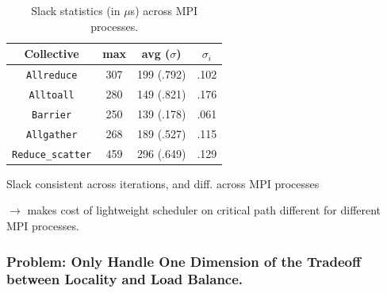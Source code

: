 {\begin{frame}
\begin{table}[tr]
\label{fig:collectiveSlack-useq}
  \begin{center}
    \begin{tabular}{ | c || c | c || c |  }
      \hline
      \textbf{Collective}  &      \textbf{max} & \textbf{avg ($\sigma$)} & \textbf{$\sigma_i$}  \\ \hline
      \texttt{Allreduce} &             307    &    199 (.792) &            .102                  \\ \hline
      \texttt{Alltoall}  &             280    &    149 (.821) &            .176                  \\ \hline
      \texttt{Barrier}  &              250    &    139 (.178)  &           .061                  \\ \hline
      \texttt{Allgather} &             268    &    189 (.527) &            .115                  \\ \hline
      \texttt{Reduce\_scatter} &       459    &    296  (.649)  &          .129                  \\ \hline
    \end{tabular}
  \end{center}
  \caption{\label{fig:collectiveSlack-useq}
    Slack statistics (in $\mu$s) across MPI processes.}
{\small Slack consistent across iterations, and diff. across MPI processes } \\
\end{table}
{\small $\rightarrow$ makes cost of lightweight scheduler on critical path different for different MPI processes.} 
\end{frame}

\begin{frame}
\frametitle{Problem: Only Handle One Dimension of the Tradeoff between Locality and Load Balance.}


\end{frame}}
